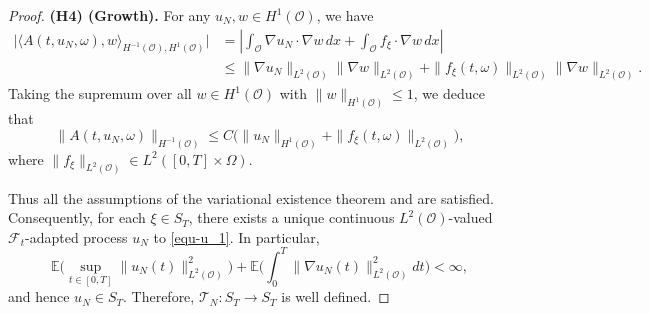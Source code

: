 \documentclass[reqno, 11pt]{amsart}
\theoremstyle{definition}
\numberwithin{equation}{section} \numberwithin{lem}{section}
\numberwithin{thm}{section} \numberwithin{prop}{section}
\numberwithin{cor}{section} \numberwithin{rem}{section}
\numberwithin{defn}{section}
\begin{document}
\begin{proof}
\noindent\textbf{(H4) (Growth).}
For any $u_N,w\in H^1(\mathcal {O})$, we have
\begin{align*}
    \big|\langle A(t,u_N,\omega),w\rangle_{H^{-1}{(\mathcal {O})},H^1{(\mathcal {O})}}\big|
&=
\left|\int_{\mathcal {O}}\nabla u_N\cdot \nabla w\,dx+\int_{\mathcal {O}}f_\xi \cdot \nabla w\,dx\right|
\\&\le
\|\nabla u_N\|_{L^2(\mathcal {O})}\|\nabla w\|_{L^2(\mathcal {O})}+\|f_\xi(t,\omega)\|_{L^2(\mathcal {O})}\|\nabla w\|_{L^2(\mathcal {O})}.
\end{align*}
Taking the supremum over all $w\in H^1(\mathcal {O})$ with $\|w\|_{H^1(\mathcal {O})}\le 1$, we deduce that
\[
\|A(t,u_N,\omega)\|_{H^{-1}(\mathcal {O})}
\le C\big(\|u_N\|_{H^1(\mathcal {O})}+\|f_\xi(t,\omega)\|_{L^2(\mathcal {O})}\big),
\]
where $\|f_\xi\|_{L^2(\mathcal {O})}\in  L^2([0,T]\times \Omega) $.

Thus all the assumptions of the variational existence theorem \cite[Theorem 4.2.4]{liu2015stochastic} and \cite[Theorem 4.7]{gawarecki2010stochastic} are satisfied. Consequently, for each $\xi\in S_T$,
there exists a unique continuous $L^2(\mathcal{O})$-valued ${\mathcal{F}_t}$-adapted process $u_N$
to \eqref{equ-u_1}. In particular,
\[
\mathbb E\Big(\sup_{t\in[0,T]}\|u_N(t)\|_{L^2(\mathcal O)}^2\Big)
+\mathbb E\Big(\int_0^T\|\nabla u_N(t)\|_{L^2(\mathcal O)}^2dt\Big)<\infty,
\]
and hence $u_N\in S_T$. Therefore, $\mathcal T_N:S_T\to S_T$ is well defined.



\end{proof}
\end{document}
